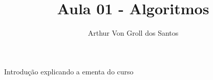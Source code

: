 \documentclass{article}
\author{Arthur Von Groll dos Santos}
\begin{document}
\title{Aula 01 - Algoritmos}
\maketitle

Introdução explicando a ementa do curso
\end{document}
